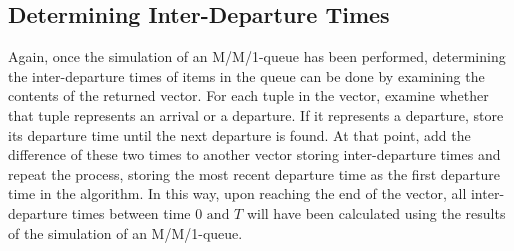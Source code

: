 \documentclass[11pt, oneside]{article}
\begin{document}
\subsection{Determining Inter-Departure Times}
Again, once the simulation of an M/M/1-queue has been performed, determining the inter-departure times of items in the queue can be done by examining the contents of the returned vector. For each tuple in the vector, examine whether that tuple represents an arrival or a departure. If it represents a departure, store its departure time until the next departure is found. At that point, add the difference of these two times to another vector storing inter-departure times and repeat the process, storing the most recent departure time as the first departure time in the algorithm. In this way, upon reaching the end of the vector, all inter-departure times between time $0 \text{ and } T$ will have been calculated using the results of the simulation of an M/M/1-queue.
\end{document}
